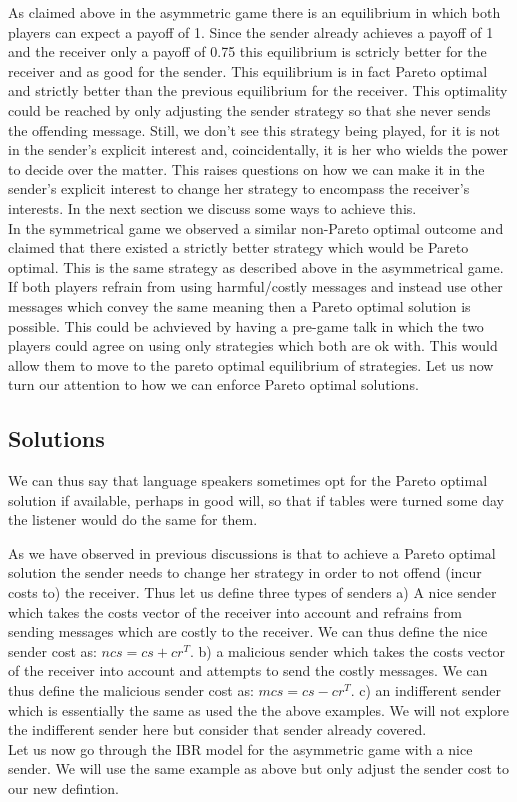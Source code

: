 \documentclass{article}
\begin{document}
As claimed above in the asymmetric game there is an equilibrium in which both players can expect a payoff of 1. Since the sender already achieves a payoff of 1 and the receiver only a payoff of 0.75 this equilibrium is sctricly better for the receiver and as good for the sender. This equilibrium is in fact Pareto optimal and strictly better than the previous equilibrium for the receiver. This optimality could be reached by only adjusting the sender strategy so that she never sends the offending message. Still, we don't see this strategy being played, for it is not in the sender's explicit interest and, coincidentally, it is her who wields the power to decide over the matter. This raises questions on how we can make it in the sender's explicit interest to change her strategy to encompass the receiver's interests. In the next section we discuss some ways to achieve this.\\
In the symmetrical game we observed a similar non-Pareto optimal outcome and claimed that there existed a strictly better strategy which would be Pareto optimal. This is the same strategy as described above in the asymmetrical game. If both players refrain from using harmful/costly messages and instead use other messages which convey the same meaning then a Pareto optimal solution is possible. This could be achvieved by having a pre-game talk in which the two players could agree on using only strategies which both are ok with. This would allow them to move to the pareto optimal equilibrium of strategies. Let us now turn our attention to how we can enforce Pareto optimal solutions.

\subsection{Solutions}

We can thus say that language speakers sometimes opt for the Pareto optimal solution if available, perhaps in good will, so that if tables were turned some day the listener would do the same for them.

As we have observed in previous discussions is that to achieve a Pareto optimal solution the sender needs to change her strategy in order to not offend (incur costs to) the receiver. Thus let us define three types of senders a) A nice sender which takes the costs vector of the receiver into account and refrains from sending messages which are costly to the receiver. We can thus define the nice sender cost as: $ncs=cs + cr^T$. b) a malicious sender which takes the costs vector of the receiver into account and attempts to send the costly messages. We can thus define the malicious sender cost as: $mcs=cs - cr^T$. c) an indifferent sender which is essentially the same as used the the above examples. We will not explore the indifferent sender here but consider that sender already covered. \\
Let us now go through the IBR model for the asymmetric game with a nice sender. We will use the same example as above but only adjust the sender cost to our new defintion.
\end{document}
